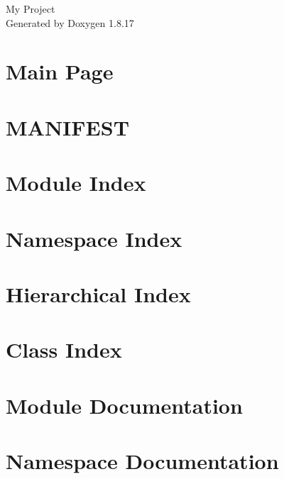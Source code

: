 \let\mypdfximage\pdfximage\def\pdfximage{\immediate\mypdfximage}\documentclass[twoside]{book}
\newcommand{\+}{\discretionary{\mbox{\scriptsize$\hookleftarrow$}}{}{}}
\newcommand{\clearemptydoublepage}{%
  \newpage{\pagestyle{empty}\cleardoublepage}%
}
\begin{document}
\hypersetup{pageanchor=false,
             bookmarksnumbered=true,
             pdfencoding=unicode
            }
\begin{titlepage}
\vspace*{7cm}
\begin{center}%
{\Large My Project }\\
\vspace*{1cm}
{\large Generated by Doxygen 1.8.17}\\
\end{center}
\end{titlepage}
\clearemptydoublepage
{}
\tableofcontents
\clearemptydoublepage
{}
\hypersetup{pageanchor=true}

\chapter{Main Page}
\label{index}\hypertarget{index}{}
\chapter{M\+A\+N\+I\+F\+E\+ST}
\label{md_MANIFEST}

\chapter{Module Index}

\chapter{Namespace Index}

\chapter{Hierarchical Index}

\chapter{Class Index}

\chapter{Module Documentation}

\chapter{Namespace Documentation}




\end{document}
